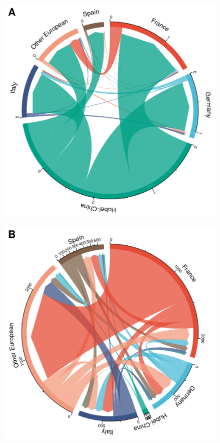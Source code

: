\documentclass[12pt]{article}
\begin{document}
\begin{figure}[!tbp]
  \centering

  \begin{minipage}[t]{0.4\textwidth}
  \includegraphics[width=\textwidth]{201030_europe3_figtraj09a.png}
  \label{fig:migs1}
  \end{minipage}
  \begin{minipage}[t]{0.4\textwidth}
  \includegraphics[width=\textwidth]{201030_europe3_figtraj09b.png}

\end{minipage}
\end{figure}
\end{document}
